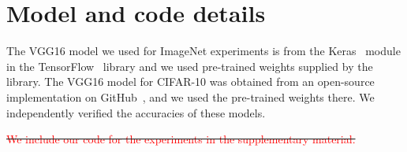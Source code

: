 \documentclass{article}
\newcommand{\pl}[1]{\textcolor{red}{[PL: #1]}}
\newcommand{\pldel}[1]{\sout{\textcolor{red}{#1}}}
\begin{document}
















\appendix

\newpage 
\section{Model and code details}

The VGG16 model we used for ImageNet experiments is from the Keras~\cite{chollet2015} module in the TensorFlow~\cite{tensorflow2015-whitepaper} library and we used pre-trained weights supplied by the library. The VGG16 model for CIFAR-10 was obtained from an open-source implementation on GitHub~\cite{geifman2017}, and we used the pre-trained weights there. We independently verified the accuracies of these models.

\pldel{We include our code for the experiments in the supplementary material.}












\end{document}
